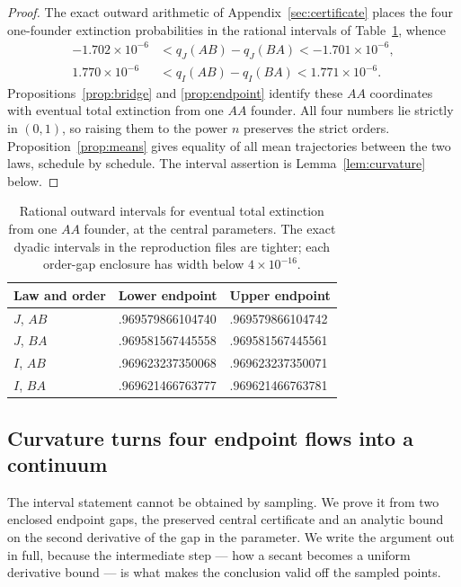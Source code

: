 \documentclass[11pt]{article}
\theoremstyle{remark}
\begin{document}
\begin{proof}
The exact outward arithmetic of Appendix~\ref{sec:certificate} places the four
one-founder extinction probabilities in the rational intervals of
Table~\ref{tab:certificate}, whence
\begin{align}
 -1.702\times10^{-6}&<q_J(AB)-q_J(BA)<-1.701\times10^{-6},\label{eq:gapJ}\\
  1.770\times10^{-6}&<q_I(AB)-q_I(BA)< 1.771\times10^{-6}.\label{eq:gapI}
\end{align}
Propositions~\ref{prop:bridge} and \ref{prop:endpoint} identify these $AA$
coordinates with eventual total extinction from one $AA$ founder. All four
numbers lie strictly in $(0,1)$, so raising them to the power $n$ preserves the
strict orders. Proposition~\ref{prop:means} gives equality of all mean
trajectories between the two laws, schedule by schedule. The interval assertion
is Lemma~\ref{lem:curvature} below.
\end{proof}

\begin{table}[ht]
\centering
\caption{Rational outward intervals for eventual total extinction from one $AA$
founder, at the central parameters. The exact dyadic intervals in the
reproduction files are tighter; each order-gap enclosure has width below
$4\times10^{-16}$.}
\label{tab:certificate}
\begin{tabular}{lll}\toprule
Law and order&Lower endpoint&Upper endpoint\\\midrule
$J$, $AB$&.969579866104740&.969579866104742\\
$J$, $BA$&.969581567445558&.969581567445561\\
$I$, $AB$&.969623237350068&.969623237350071\\
$I$, $BA$&.969621466763777&.969621466763781\\\bottomrule
\end{tabular}
\end{table}

\subsection{Curvature turns four endpoint flows into a continuum}
The interval statement cannot be obtained by sampling. We prove it from two
enclosed endpoint gaps, the preserved central certificate and an analytic bound
on the second derivative of the gap in the parameter. We write the argument out
in full, because the intermediate step --- how a secant becomes a uniform
derivative bound --- is what makes the conclusion valid off the sampled points.
\end{document}
